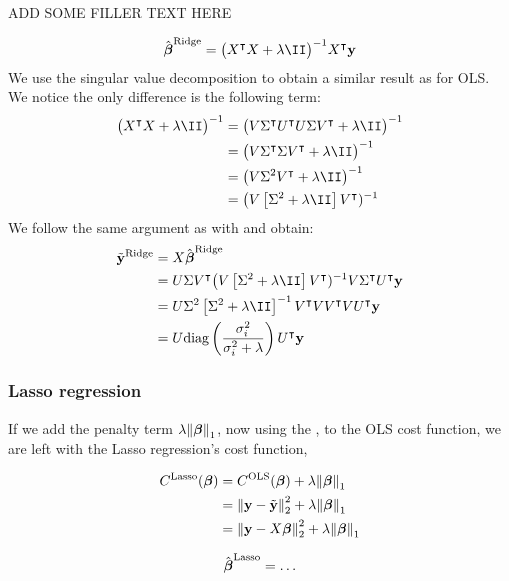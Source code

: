 ADD SOME FILLER TEXT HERE

\begin{align*}
    \optbeta^\text{Ridge} = \big(\hessian + \lambda \II\big)^{-1} X\TT\vec{y}
\end{align*}
We use the singular value decomposition to obtain a similar result as for OLS. We notice the only difference is the following term:
\begin{align*}
    \big(\hessian + \lambda\II\big)^{-1} &= \big(V\ST\UT U\S\VT + \lambda\II\big)^{-1}\\
    &= \big(V\ST\S\VT + \lambda\II\big)^{-1} \\
    &=\big(V\S^2\VT + \lambda\II\big)^{-1} \\
    &= \big(V\left[\S^2+\lambda\II\right]\VT)^{-1}
\end{align*}
We follow the same argument as with  and obtain:
\begin{align*}
    \tilde{\vec{y}}^{\text{Ridge}} &=X\optbeta^{\text{Ridge}} \\
    &= U\S\VT \big(V\left[\S^2+\lambda\II\right]\VT)^{-1} V\ST\UT\vec{y} \\
    &= U\S^2\left[\S^2+\lambda\II\right]^{-1} \VT V\VT V\UT\vec{y} \\
    &= U\text{diag}\left(\frac{\sigma_i^2}{\sigma_i^2+\lambda}\right)\UT\vec{y}
\end{align*}



\subsubsection{Lasso regression}\label{sec:Lasso}

If we add the penalty term $\lambda \norm{\boldsymbol{\beta}}_1$, now using the \footnotemark, to the OLS cost function, we are left with the Lasso regression's cost function,

\begin{align*}
    C^\text{Lasso}(\boldsymbol{\beta})  &= C^\text{OLS}(\boldsymbol{\beta}) + \lambda \norm{\boldsymbol{\beta}}_1 \\
    &= \norm{\mathbf{y}-\tilde{\mathbf{y}}}_2^{2}  + \lambda \norm{\boldsymbol{\beta}}_{1} \\
    &= \norm{\mathbf{y}-X\boldsymbol{\beta}}_2^{2} + \lambda \norm{\boldsymbol{\beta}}_{1}
\end{align*}

\begin{align*}
    \hat{\boldsymbol{\beta}}^\text{Lasso} = \dots
\end{align*}

